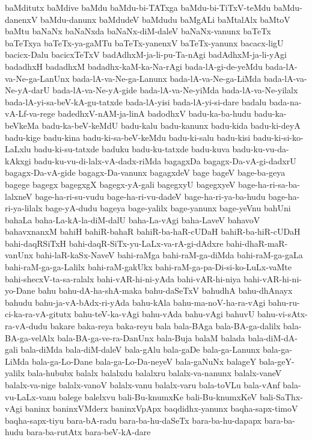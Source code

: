 {baMditutx
baMdive
baMdu
baMdu-bi-TATxga
baMdu-bi-TiTxV-teMdu
baMdu-danenxV
baMdu-danunx
baMdudeV
baMdudu
baMgALi
baMtalAlx
baMtoV
baMtu
baNaNx
baNaNxda
baNaNx-diM-daleV
baNaNx-vanunx
baTeTx
baTeTxya
baTeTx-ya-gaMTu
baTeTx-yanenxV
baTeTx-yanunx
bacacx-ligU
bacicx-Dalu
bacicxTeTxV
badAdhxM-ja-li-pu-Ta-nAgi
badAdhxM-ja-li-yAgi
badadhxH
badadhxM
badadhx-kaM-ka-Na-rAgi
bada-lA-gi-de-yeMdu
bada-lA-va-Ne-ga-LanUnx
bada-lA-va-Ne-ga-Lanunx
bada-lA-va-Ne-ga-LiMda
bada-lA-va-Ne-yA-darU
bada-lA-va-Ne-yA-gide
bada-lA-va-Ne-yiMda
bada-lA-va-Ne-yilalx
bada-lA-yi-sa-beV-kA-gu-tatxde
bada-lA-yisi
bada-lA-yi-si-dare
badalu
bada-na-vA-Lf-va-rege
badedhxV-nAM-ja-linA
badodhxV
badu-ka-ba-hudu
badu-ka-beVkeMa
badu-ka-beV-keMdU
badu-kalu
badu-kanunx
badu-kida
badu-ki-deyA
badu-kige
badu-kina
badu-ki-sa-beV-keMdu
badu-ki-salu
badu-kisi
badu-ki-si-ko-LaLxlu
badu-ki-su-tatxde
baduku
badu-ku-tatxde
badu-kuva
badu-ku-vu-da-kAkxgi
badu-ku-vu-di-lalx-vA-dadx-riMda
bagagxDa
bagagx-Da-vA-gi-dadxrU
bagagx-Da-vA-gide
bagagx-Da-vanunx
bagagxdeV
bage
bageV
bage-ba-geya
bagege
bagegx
bagegxgX
bagegx-yA-gali
bagegxyU
bagegxyeV
bage-ha-ri-sa-ba-lalxneV
bage-ha-ri-su-vudu
bage-ha-ri-vu-dadeV
bage-ha-ri-ya-ba-hudu
bage-ha-ri-ya-lilalx
bage-yA-dudu
bageya
bage-yalilx
bage-yanunx
bage-yeVnu
bahUni
bahaLa
baha-La-kA-la-diM-dalU
baha-La-vAgi
baha-LaveV
bahavoV
bahavxnanxM
bahiH
bahiR-bahaR
bahiR-ba-haR-cUDaH
bahiR-ba-hiR-cUDaH
bahi-daqRSiTxH
bahi-daqR-SiTx-yu-LaLx-va-rA-gi-dAdxre
bahi-dhaR-maR-vanUnx
bahi-laR-kaSx-NaveV
bahi-raMga
bahi-raM-ga-diMda
bahi-raM-ga-gaLa
bahi-raM-ga-ga-Lalilx
bahi-raM-gakUkx
bahi-raM-ga-pa-Di-si-ko-LuLx-vaMte
bahi-shecxV-ta-sa-ralalx
bahi-vAR-hi-ni-yAda
bahi-vAR-hi-niya
bahi-vAR-hi-ni-yo-Dane
bahu
bahu-dA-ha-shA-maka
bahu-daSeTxV
bahudhA
bahu-dhAnayx
bahudu
bahu-ja-vA-bAdx-ri-yAda
bahu-kAla
bahu-ma-noV-ha-ra-vAgi
bahu-ru-ci-ka-ra-vA-gitutx
bahu-teV-ka-vAgi
bahu-vAda
bahu-vAgi
bahuvU
bahu-vi-sAtx-ra-vA-dudu
bakare
baka-reya
baka-reyu
bala
bala-BAga
bala-BA-ga-dalilx
bala-BA-ga-velAlx
bala-BA-ga-ve-ra-DanUnx
bala-Buja
balaM
balada
bala-diM-dA-gali
bala-diMda
bala-diM-daleV
bala-gAlu
bala-gaDe
bala-ga-Lanunx
bala-ga-LiMda
bala-ga-Lo-Dane
bala-ga-Lo-Da-neyeV
bala-gaNuNx
balageY
bala-geY-yalilx
bala-hububx
balalx
balalxdu
balalxru
balalx-va-nanunx
balalx-vaneV
balalx-va-nige
balalx-vanoV
balalx-vanu
balalx-varu
bala-toVLu
bala-vAnf
bala-vu-LaLx-vanu
balege
balelxvu
bali-Bu-knumxKe
bali-Bu-knumxKeV
bali-SaThx-vAgi
baninx
baninxVMderx
baninxVpApx
baqdidhx-yanunx
baqha-sapx-timoV
baqha-sapx-tiyu
bara-bA-radu
bara-ba-hu-daSeTx
bara-ba-hu-dapapx
bara-ba-hudu
bara-ba-rutAtx
bara-beV-kA-dare
}
